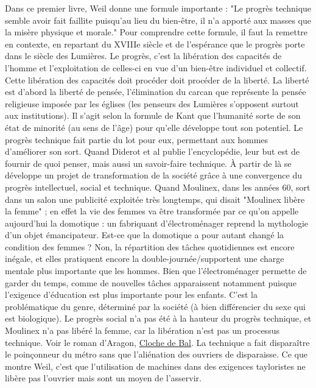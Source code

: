 \documentclass[a4paper,12pt]{book}
\begin{document}
\par Dans ce premier livre, Weil donne une formule importante : "Le progrès technique semble avoir fait faillite puisqu'au lieu du bien-être, il n'a apporté aux masses que la misère physique et morale." Pour comprendre cette formule, il faut la remettre en contexte, en repartant du XVIIIe siècle et de l'espérance que le progrès porte dans le siècle des Lumières. Le progrès, c'est la libération des capacités de l'homme et l'exploitation de celles-ci en vue d'un bien-être individuel et collectif. Cette libération des capacités doit procéder doit procéder de la liberté. La liberté est d'abord la liberté de pensée, l'élimination du carcan que représente la pensée religieuse imposée par les églises (les penseurs des Lumières s'opposent surtout aux institutions). Il s'agit selon la formule de Kant que l'humanité sorte de son état de minorité (au sens de l'âge) pour qu'elle développe tout son potentiel. Le progrès technique fait partie du lot pour eux, permettant aux hommes d'améliorer son sort. Quand Diderot et al publie l'encyclopédie, leur but est de fournir de quoi penser, mais aussi un savoir-faire technique. À partir de là se développe un projet de transformation de la société grâce à une convergence du progrès intellectuel, social et technique. Quand Moulinex, dans les années 60, sort dans un salon une publicité exploitée très longtemps, qui disait "Moulinex libère la femme" ; en effet la vie des femmes va être transformée par ce qu'on appelle aujourd'hui la domotique : un fabriquant d'électroménager reprend la mythologie d'un objet émancipateur. Est-ce que la domotique a pour autant changé la condition des femmes ? Non, la répartition des tâches quotidiennes est encore inégale, et elles pratiquent encore la double-journée/supportent une charge mentale plus importante que les hommes. Bien que l'électroménager permette de garder du temps, comme de nouvelles tâches apparaissent notamment puisque l'exigence d'éducation est plus importante pour les enfants. C'est la problématique du genre, déterminé par la société (à bien différencier du sexe qui est biologique). Le progrès social n'a pas été à la hauteur du progrès technique, et Moulinex n'a pas libéré la femme, car la libération n'est pas un processus technique. Voir le roman d'Aragon, \underline{Cloche de Bal}. La technique a fait disparaître le poinçonneur du métro sans que l'aliénation des ouvriers de disparaisse. Ce que montre Weil, c'est que l'utilisation de machines dans des exigences tayloristes ne libère pas l'ouvrier mais sont un moyen de l'asservir.
\end{document}
